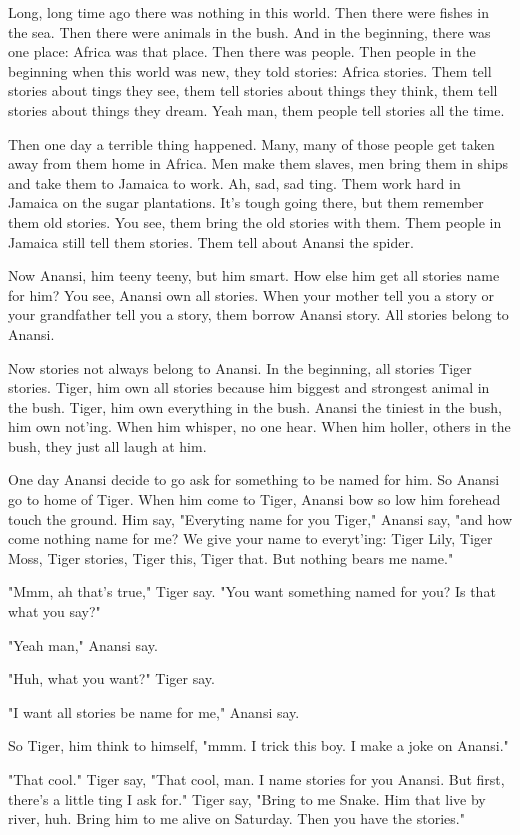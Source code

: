 Long, long time ago there was nothing in this world. Then there were fishes in the sea. Then there were animals in the bush. And in the beginning, there was one place: Africa was that place. Then there was people. Then people in the beginning when this world was new, they told stories: Africa stories. Them tell stories about tings they see, them tell stories about things they think, them tell stories about things they dream. Yeah man, them people tell stories all the time.

Then one day a terrible thing happened. Many, many of those people get taken away from them home in Africa. Men make them slaves, men bring them in ships and take them to Jamaica to work. Ah, sad, sad ting. Them work hard in Jamaica on the sugar plantations. It's tough going there, but them remember them old stories. You see, them bring the old stories with them. Them people in Jamaica still tell them stories. Them tell about Anansi the spider.

Now Anansi, him teeny teeny, but him smart. How else him get all stories name for him? You see, Anansi own all stories. When your mother tell you a story or your grandfather tell you a story, them borrow Anansi story. All stories belong to Anansi.

Now stories not always belong to Anansi. In the beginning, all stories Tiger stories. Tiger, him own all stories because him biggest and strongest animal in the bush. Tiger, him own everything in the bush. Anansi the tiniest in the bush, him own not'ing. When him whisper, no one hear. When him holler, others in the bush, they just all laugh at him.

One day Anansi decide to go ask for something to be named for him. So Anansi go to home of Tiger. When him come to Tiger, Anansi bow so low him forehead touch the ground. Him say, "Everyting name for you Tiger," Anansi say, "and how come nothing name for me? We give your name to everyt'ing: Tiger Lily, Tiger Moss, Tiger stories, Tiger this, Tiger that. But nothing bears me name."

"Mmm, ah that's true," Tiger say. "You want something named for you? Is that what you say?"

"Yeah man," Anansi say.

"Huh, what you want?" Tiger say.

"I want all stories be name for me," Anansi say.

So Tiger, him think to himself, "mmm. I trick this boy. I make a joke on Anansi."

"That cool." Tiger say, "That cool, man. I name stories for you Anansi. But first, there's a little ting I ask for." Tiger say, "Bring to me Snake. Him that live by river, huh. Bring him to me alive on Saturday. Then you have the stories."

